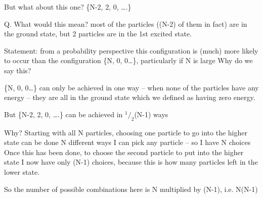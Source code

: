\documentclass[a4paper,12pt,titlepage]{article}
\begin{document}
\begin{frame}[allowframebreaks]
But what about this one?    \quad   \{N-2, 2, 0, ….\} \medskip
 
Q. What would this mean? \newline
most of the particles ((N-2) of them in fact) are in the ground state, but 2 particles are in the 1st excited state.\newline

Statement: from a probability perspective this configuration is (much) more likely to occur than the configuration \{N, 0, 0…\}, particularly if N is large\newline
Why do we say this?\newline

\{N, 0, 0…\} can only be achieved in one way -- when none of the particles have any energy -- they are all in the ground state which we defined as having zero energy. 
 
But \{N-2, 2, 0, ….\} can be achieved in \(^1/_2\)(N-1) ways\newline
 
Why?
Starting with all N particles, choosing one particle to go into the higher state can be done N different ways\newline\smallskip
I can pick any particle -- so I have N choices
Once this has been done, to choose the second particle to put into the higher state I now have only (N-1) choices, because this is how many particles left in the lower state.\par\smallskip So the number of possible combinations here is N multiplied by (N-1), i.e. N(N-1) 
\end{frame}
\end{document}
